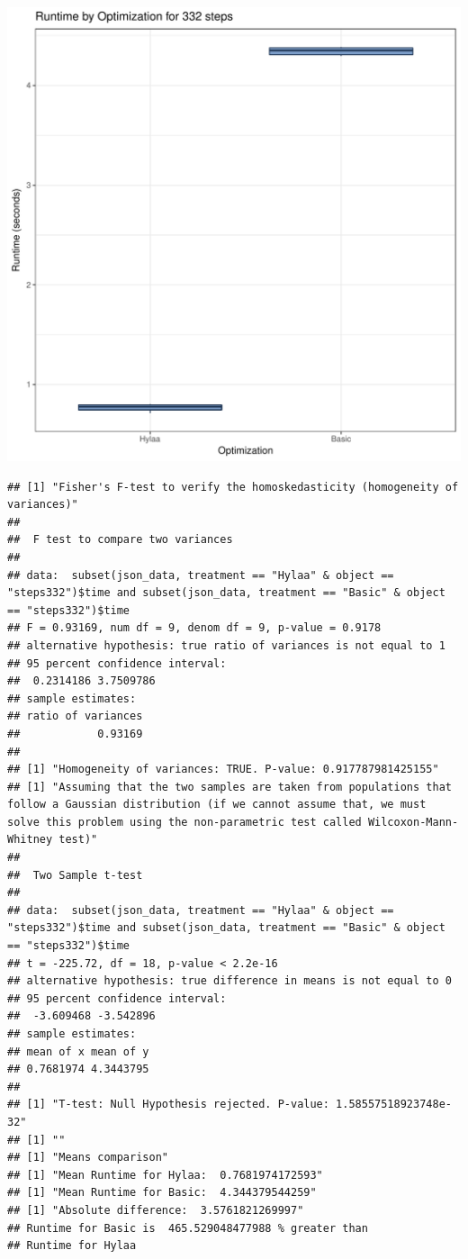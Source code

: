 \documentclass{article}\usepackage[]{graphicx}\usepackage[]{color}
\makeatletter
\def\maxwidth{ %
  \ifdim\Gin@nat@width>\linewidth
    \linewidth
  \else
    \Gin@nat@width
  \fi
}
\newenvironment{kframe}{%
 \def\at@end@of@kframe{}%
 \ifinner\ifhmode%
  \def\at@end@of@kframe{\end{minipage}}%
  \begin{minipage}{\columnwidth}%
 \fi\fi%
 \def\FrameCommand##1{\hskip\@totalleftmargin \hskip-\fboxsep
 \colorbox{shadecolor}{##1}\hskip-\fboxsep
     \hskip-\linewidth \hskip-\@totalleftmargin \hskip\columnwidth}%
 \MakeFramed {\advance\hsize-\width
   \@totalleftmargin\z@ \linewidth\hsize
   \@setminipage}}%
 {\par\unskip\endMakeFramed%
 \at@end@of@kframe}
\newenvironment{knitrout}{}{} %
\makeatother
\begin{document}
\begin{knitrout}
\color{fgcolor}
\includegraphics[width=\maxwidth]{figure/RH3_steps332-1} 
\begin{kframe}\begin{verbatim}
## [1] "Fisher's F-test to verify the homoskedasticity (homogeneity of variances)"
## 
## 	F test to compare two variances
## 
## data:  subset(json_data, treatment == "Hylaa" & object == "steps332")$time and subset(json_data, treatment == "Basic" & object == "steps332")$time
## F = 0.93169, num df = 9, denom df = 9, p-value = 0.9178
## alternative hypothesis: true ratio of variances is not equal to 1
## 95 percent confidence interval:
##  0.2314186 3.7509786
## sample estimates:
## ratio of variances 
##            0.93169 
## 
## [1] "Homogeneity of variances: TRUE. P-value: 0.917787981425155"
## [1] "Assuming that the two samples are taken from populations that follow a Gaussian distribution (if we cannot assume that, we must solve this problem using the non-parametric test called Wilcoxon-Mann-Whitney test)"
## 
## 	Two Sample t-test
## 
## data:  subset(json_data, treatment == "Hylaa" & object == "steps332")$time and subset(json_data, treatment == "Basic" & object == "steps332")$time
## t = -225.72, df = 18, p-value < 2.2e-16
## alternative hypothesis: true difference in means is not equal to 0
## 95 percent confidence interval:
##  -3.609468 -3.542896
## sample estimates:
## mean of x mean of y 
## 0.7681974 4.3443795 
## 
## [1] "T-test: Null Hypothesis rejected. P-value: 1.58557518923748e-32"
## [1] ""
## [1] "Means comparison"
## [1] "Mean Runtime for Hylaa:  0.7681974172593"
## [1] "Mean Runtime for Basic:  4.344379544259"
## [1] "Absolute difference:  3.5761821269997"
## Runtime for Basic is  465.529048477988 % greater than 
## Runtime for Hylaa
\end{verbatim}
\end{kframe}
\end{knitrout}
\end{document}
